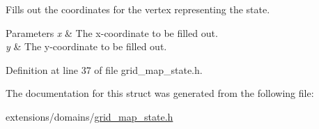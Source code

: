 Fills out the coordinates for the vertex representing the state. 


\begin{DoxyParams}{Parameters}
{\em x} & The x-\/coordinate to be filled out. \\
\hline
{\em y} & The y-\/coordinate to be filled out. \\
\hline
\end{DoxyParams}


Definition at line 37 of file grid\+\_\+map\+\_\+state.\+h.



The documentation for this struct was generated from the following file\+:\begin{DoxyCompactItemize}
\item 
extensions/domains/\hyperlink{grid__map__state_8h}{grid\+\_\+map\+\_\+state.\+h}\end{DoxyCompactItemize}

